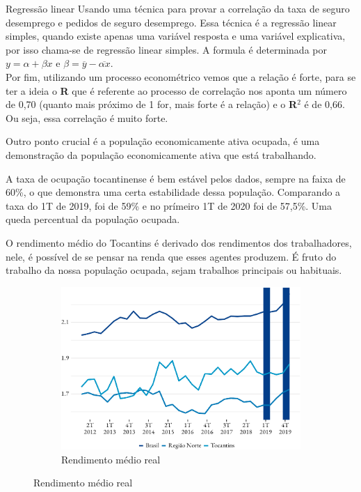 \begin{smbox}[label={labelbox},nameref={Desigualdade por gênero}]{Regressão linear}
	Usando uma técnica para provar a correlação da taxa de seguro desemprego e pedidos de seguro desemprego. Essa técnica é a regressão linear simples, quando existe apenas uma variável resposta e uma variável explicativa, por isso chama-se de regressão linear simples. A formula é determinada por $y = \alpha + \beta x$ e $\beta = \overline{y} - \overline{\alpha x}$.
	\\
	Por fim, utilizando um processo econométrico vemos que a relação é forte, para se ter a ideia o \textbf{R} que é referente ao processo de correlação nos aponta um número de 0,70 (quanto mais próximo de 1 for, mais forte é a relação) e o \textbf{R}$^{2}$ é de 0,66. Ou seja, essa correlação é muito forte. 
\end{smbox}



\par Outro ponto crucial é a população economicamente ativa ocupada, é uma demonstração da população economicamente ativa que está trabalhando.



\par  A taxa de ocupação tocantinense é bem estável pelos dados, sempre na faixa de 60\%, o que demonstra uma certa estabilidade dessa população. Comparando a taxa do 1T de 2019, foi de 59\% e no prímeiro 1T de 2020 foi de 57,5\%. Uma queda percentual da população ocupada.



\par O rendimento médio do Tocantins é derivado dos rendimentos dos trabalhadores, nele, é possível de se pensar na renda que esses agentes produzem. É fruto do trabalho da nossa população ocupada, sejam trabalhos principais ou habituais. 

\begin{figure}[!h]
	\begin{subfigure}{\linewidth}
		\caption{Rendimento médio real}
		\includegraphics{fig/rend_medio-1.pdf}
	\end{subfigure}
\end{figure}



